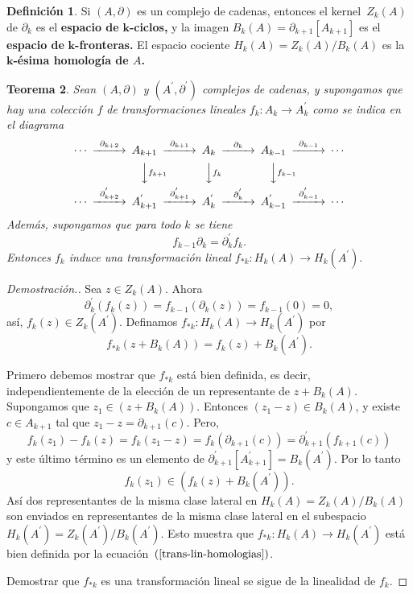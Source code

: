 \documentclass[12pt]{book}
\newtheorem{theorem}{Teorema}[section]
\theoremstyle{definition}
\newtheorem{definition}[theorem]{Definición}
\newcounter{in}
\newcounter{ini}
\begin{document}
\begin{definition}
  Si $(A,\partial)$ es un complejo de cadenas, entonces el
  kernel~$Z_{k}(A)$ de $\partial_{k}$ es el\textbf{ espacio de}
  $\boldsymbol{k}$\textbf{-ciclos,} y la imagen $B_{k}(A)=\partial_{k+1}[A_{k+1}]$ es el \textbf{espacio
    de} $\boldsymbol{k}$\textbf{-fronteras.} El espacio cociente $H_{k}(A)=Z_{k}(A)/B_{k}(A)$
  es la $\boldsymbol{k}$\textbf{-ésima homología de $A$.}
\end{definition}

\begin{theorem}
  Sean $(A,\partial)$ y $(A^{'},\partial^{'})$ complejos de cadenas, y
  supongamos que hay una colección $f$ de transformaciones lineales
  $f_{k}:A_{k}\rightarrow A^{'}_{k}$ como se indica en el diagrama  
  \[
  \begin{CD}
    \cdots @>{\partial_{k+2}}>> A_{k+1} @>{\partial_{k+1}}>> A_{k} @>{\partial_{k}}>> A_{k-1} @>{\partial_{k-1}}>> \cdots\\
    @.   @VVf_{k+1}V   @VVf_{k}V   @VVf_{k-1}V    \\
    \cdots @>{\partial^{'}_{k+2}}>> A^{'}_{k+1} @>{\partial^{'}_{k+1}}>> A^{'}_{k} @>{\partial^{'}_{k}}>> A^{'}_{k-1} @>{\partial^{'}_{k-1}}>> \cdots
  \end{CD}
  \]
  Además, supongamos que para todo $k$ se tiene
  $$f_{k-1}\partial_{k}=\partial^{'}_{k}f_{k}.$$
  Entonces $f_{k}$ induce una transformación lineal
  $f_{*k}:H_{k}(A)\rightarrow H_{k}(A^{'}).$
\end{theorem}
\begin{proof}[Demostración.]
  Sea $z\in Z_{k}(A)$. Ahora
  \begin{equation*}
    \partial^{'}_{k}(f_{k}(z))=f_{k-1}(\partial_{k}(z))=f_{k-1}(0)=0,
  \end{equation*}
  así, $f_{k}(z)\in Z_{k}(A^{'})$. Definamos
  $f_{*k}:H_{k}(A)\rightarrow H_{k}(A^{'})$ por
  \begin{equation}
    \label{trans-lin-homologias}
    f_{*k}(z+B_{k}(A))=f_{k}(z)+B_{k}(A^{'}).
  \end{equation}
  
  Primero debemos mostrar que $f_{*k}$ está bien definida, es decir,
  independientemente de la elección de un representante de
  $z+B_{k}(A).$ Supongamos que $z_{1}\in (z+B_{k}(A)).$ Entonces
  $(z_{1}-z)\in B_{k}(A)$, y existe $c\in A_{k+1}$ tal que
  $z_{1}-z=\partial_{k+1}(c).$ Pero,
  $$f_{k}(z_{1})-f_{k}(z)=f_{k}(z_{1}-z)=f_{k}(\partial_{k+1}(c))=\partial^{'}_{k+1}(f_{k+1}(c))$$
  y este último término es un elemento de
  $\partial^{'}_{k+1}[A^{'}_{k+1}]=B_{k}(A^{'}).$ Por lo tanto
  $$f_{k}(z_{1})\in (f_{k}(z)+B_{k}(A^{'})).$$
  Así dos representantes de la misma clase lateral en
  $H_{k}(A)=Z_{k}(A)/B_{k}(A)$ son enviados en representantes de la misma
  clase lateral en el subespacio $H_{k}(A^{'})=Z_{k}(A^{'})/B_{k}(A^{'})$. Esto muestra
  que $f_{*k}:H_{k}(A)\rightarrow H_{k}(A^{'})$ está bien definida por
  la ecuación~$(\ref{trans-lin-homologias})$.
  
  Demostrar que $f_{*k}$ es una transformación lineal se sigue de la
  linealidad de $f_{k}$.
\end{proof}
\end{document}
